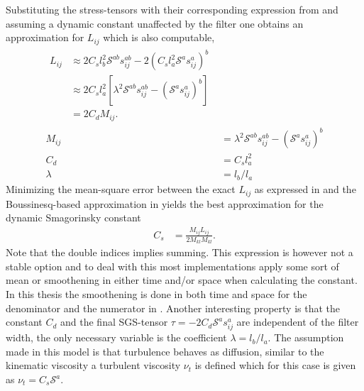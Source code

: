 Substituting the stress-tensors with their corresponding expression 
from  and assuming a dynamic constant unaffected by the filter 
one obtains an approximation for $L_{ij}$ which is also computable,
\begin{align}
    \begin{split}
L_{ij} &\approx 2C_s l_b^2 \mathcal{S}^{ab} s^{ab}_{ij}
        -2 (C_s l_a^2 \mathcal{S}^a s^a_{ij})^b\\
        &\approx 2C_sl_a^2[\lambda^2\mathcal{S}^{ab}s^{ab}_{ij} 
        - (\mathcal{S}^{a}s^{a}_{ij})^b]\\
        &= 2C_d M_{ij}.
        \label{eq:lillystress}
    \end{split} \\
    M_{ij} &= \lambda^{2}\mathcal{S}^{ab}s_{ij}^{ab} - (\mathcal{S}^as_{ij}^a)^b\\
        C_d &= C_sl_a^2\\
        \lambda &= l_b/l_a
    \label{eq:dynsmagderivation}
\end{align}
Minimizing the mean-square error between the exact $L_{ij}$ as expressed in 
and the Boussinesq-based approximation 
in  yields the best approximation 
for the dynamic Smagorinsky constant 
%
\begin{align}
    C_s &= \frac{M_{ij}L_{ij}}{2M_{kl}M_{kl}}.
    \label{eq:dynsmag}
\end{align}
%
Note that the double indices implies summing. This expression is however not a 
stable option and to deal with this most implementations apply some sort of mean or smoothening 
in either time and/or space when calculating the constant. In this thesis the smoothening is done in 
both time and space for the denominator and the numerator in . Another interesting property 
is that the constant $C_d$ and the final SGS-tensor $\tau = -2C_d\mathcal{S}^as_{ij}^a$ are 
independent of the filter width, the only necessary variable is the coefficient $\lambda = l_b/l_a$.
The assumption made in this model is that turbulence behaves 
as diffusion, similar to the kinematic viscosity a turbulent viscosity $\nu_t$ is defined which for this case is given as 
$\nu_t = C_s\mathcal{S}^a$.

